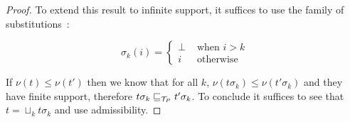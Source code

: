 \begin{proof}
    To extend this result to infinite support, it suffices to 
    use the family of substitutions~:

    \begin{equation*}
        \sigma_k (i) = \begin{cases}
            \bot & \text{ when } i > k \\
            i    & \text{ otherwise } 
        \end{cases}
    \end{equation*}

    If $\nu (t) \leq \nu (t')$ then we know that 
    for all $k$, $\nu (t\sigma_k) \leq \nu (t'\sigma_k)$
    and they have finite support, therefore 
    $t \sigma_k \sqsubseteq_{\mathcal{T}_P} t' \sigma_k$.
    To conclude it suffices to see that $t = \sqcup_k t\sigma_k$
    and use admissibility.

\end{proof}
